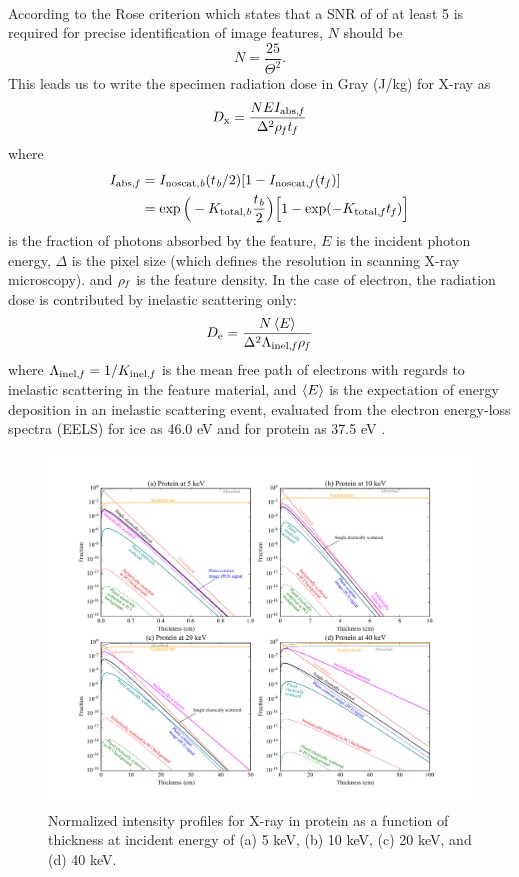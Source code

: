 \documentclass[review]{elsarticle}
\newcommand\bb{\textup{\scriptsize{\textit b}}}
\newcommand\totalb{\textup{\scriptsize{total,\textit b}}}
\newcommand\noscatb{\textup{\scriptsize{noscat,\textit b}}}
\newcommand\ff{\textup{\scriptsize{\textit f}}}
\newcommand\totalf{\textup{\scriptsize{total,\textit f}}}
\newcommand\inelf{\textup{\scriptsize{inel,\textit f}}}
\newcommand\noscatf{\textup{\scriptsize{noscat,\textit f}}}
\newcommand\absf{\textup{\scriptsize{abs,\textit f}}}
\begin{document}
\paragraph{} According to the Rose criterion which states that a SNR of of at least 5 is required for precise identification of image features, $N$ should be
\begin{equation}
N = \frac{25}{\Theta^2}.
\end{equation}
This leads us to write the specimen radiation dose in Gray (J/kg) for X-ray as 
\begin{equation}
D_\mathrm{x} = \frac{NEI_{\absf}}{\Delta^2 \rho_\ff t_\ff} 
\end{equation}
where
\begin{align}
I_\absf &= I_\noscatb(t_\bb/2)[1 - I_\noscatf(t_\ff)] \\
&= \exp\Big(-K_\totalb\frac{t_\bb}{2}\Big)\Big[1 - \exp(-K_\totalf t_\ff)\Big]
\end{align}
is the fraction of photons absorbed by the feature, $E$ is the incident photon energy, $\Delta$ is the pixel size (which defines the resolution in scanning X-ray microscopy). and $\rho_\ff$ is the feature density. In the case of electron, the radiation dose is contributed by inelastic scattering only:
\begin{equation}
D_\mathrm{e} = \frac{N\Braket{E}}{\Delta^2 \Lambda_{\inelf} \rho_\ff}
\end{equation}
where $\Lambda_{\inelf} = 1/K_{\inelf}$ is the mean free path of electrons with regards to inelastic scattering in the feature material, and $\Braket{E}$ is the expectation of energy deposition in an inelastic scattering event, evaluated from the electron energy-loss spectra (EELS) for ice as 46.0 eV and for protein as 37.5 eV \cite{Isaacson:1975wr}.

\begin{figure}[!h]
\begin{center}
\includegraphics[scale=.6]{unimatrix_fig.pdf}
\caption{Normalized intensity profiles for X-ray in protein as a function of thickness at incident energy of (a) 5 keV, (b) 10 keV, (c) 20 keV, and (d) 40 keV.}
\label{fig:protein_x_cate}
\end{center}
\end{figure}
\end{document}
